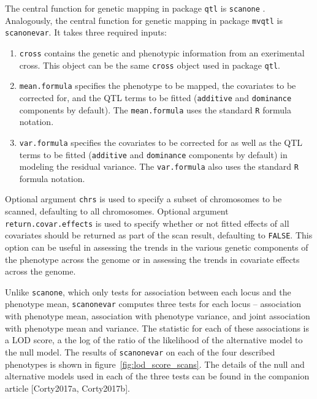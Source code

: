 \documentclass{article}
\begin{document}
The central function for genetic mapping in package \texttt{qtl} is \texttt{scanone} \citep{Broman2003}.
Analogously, the central function for genetic mapping in package \texttt{mvqtl} is \texttt{scanonevar}.
It takes three required inputs:

\begin{enumerate}
    \item \texttt{cross} contains the genetic and phenotypic information from an exerimental cross.  This object can be the same \texttt{cross} object used in package \texttt{qtl}.
    \item \texttt{mean.formula} specifies the phenotype to be mapped, the covariates to be corrected for, and the QTL terms to be fitted (\texttt{additive} and \texttt{dominance} components by default).  The \texttt{mean.formula} uses the standard \texttt{R} formula notation.
    \item \texttt{var.formula} specifies the covariates to be corrected for as well as the QTL terms to be fitted (\texttt{additive} and \texttt{dominance} components by default) in modeling the residual variance.  The \texttt{var.formula} also uses the standard \texttt{R} formula notation.
\end{enumerate}

Optional argument \texttt{chrs} is used to specify a subset of chromosomes to be scanned, defaulting to all chromosomes.
Optional argument \texttt{return.covar.effects} is used to specify whether or not fitted effects of all covariates should be returned as part of the scan result, defaulting to \texttt{FALSE}.
This option can be useful in assessing the trends in the various genetic components of the phenotype across the genome or in assessing the trends in covariate effects across the genome.

Unlike \texttt{scanone}, which only tests for association between each locus and the phenotype mean, \texttt{scanonevar} computes three tests for each locus -- association with phenotype mean, association with phenotype variance, and joint association with phenotype mean and variance.
The statistic for each of these associations is a LOD score, a the log of the ratio of the likelihood of the alternative model to the null model.
The results of \texttt{scanonevar} on each of the four described phenotypes is shown in figure~\ref{fig:lod_score_scans}.
The details of the null and alternative models used in each of the three tests can be found in the companion article [Corty2017a, Corty2017b].
\end{document}
